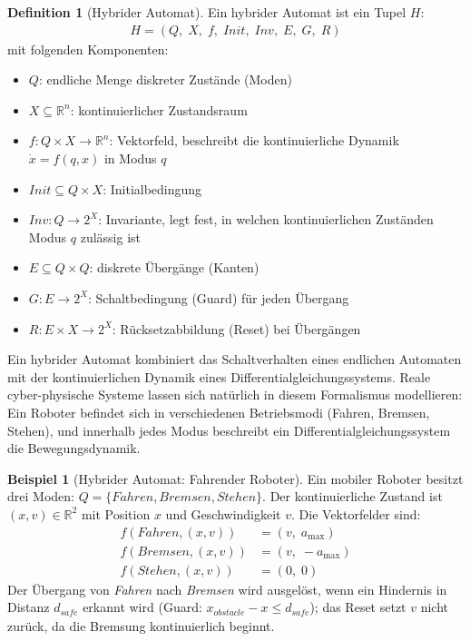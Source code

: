 ﻿\documentclass[a4paper,12pt]{article}
\theoremstyle{definition}
\newtheorem{definition}{Definition}[section]
\newtheorem{beispiel}{Beispiel}[section]
\begin{document}
\begin{definition}[Hybrider Automat]
Ein hybrider Automat ist ein Tupel $H$:
\begin{align*}
  H = (Q,\; X,\; f,\; \mathit{Init},\; \mathit{Inv},\; E,\; G,\; R)
\end{align*}
mit folgenden Komponenten:
\begin{itemize}
  \item[-] $Q$: endliche Menge diskreter Zustände (Moden)
  \item[-] $X \subseteq \mathbb{R}^n$: kontinuierlicher Zustandsraum
  \item[-] $f: Q \times X \to \mathbb{R}^n$: Vektorfeld, beschreibt die kontinuierliche Dynamik $\dot{x} = f(q, x)$ in Modus $q$
  \item[-] $\mathit{Init} \subseteq Q \times X$: Initialbedingung
  \item[-] $\mathit{Inv}: Q \to 2^X$: Invariante, legt fest, in welchen kontinuierlichen Zuständen Modus $q$ zulässig ist
  \item[-] $E \subseteq Q \times Q$: diskrete Übergänge (Kanten)
  \item[-] $G: E \to 2^X$: Schaltbedingung (Guard) für jeden Übergang
  \item[-] $R: E \times X \to 2^X$: Rücksetzabbildung (Reset) bei Übergängen
\end{itemize}
\end{definition}

Ein hybrider Automat kombiniert das Schaltverhalten eines endlichen Automaten mit der kontinuierlichen Dynamik eines Differentialgleichungssystems. Reale cyber-physische Systeme lassen sich natürlich in diesem Formalismus modellieren: Ein Roboter befindet sich in verschiedenen Betriebsmodi (Fahren, Bremsen, Stehen), und innerhalb jedes Modus beschreibt ein Differentialgleichungssystem die Bewegungsdynamik.

\begin{beispiel}[Hybrider Automat: Fahrender Roboter]
Ein mobiler Roboter besitzt drei Moden: $Q = \{\mathit{Fahren}, \mathit{Bremsen}, \mathit{Stehen}\}$. Der kontinuierliche Zustand ist $(x, v) \in \mathbb{R}^2$ mit Position $x$ und Geschwindigkeit $v$. Die Vektorfelder sind:
\begin{align}
  f(\mathit{Fahren}, (x,v))  &= (v,\; a_{\max}) \\
  f(\mathit{Bremsen}, (x,v)) &= (v,\; -a_{\max}) \\
  f(\mathit{Stehen}, (x,v))  &= (0,\; 0)
\end{align}
Der Übergang von \textit{Fahren} nach \textit{Bremsen} wird ausgelöst, wenn ein Hindernis in Distanz $d_{\mathit{safe}}$ erkannt wird (Guard: $x_{\mathit{obstacle}} - x \leq d_{\mathit{safe}}$); das Reset setzt $v$ nicht zurück, da die Bremsung kontinuierlich beginnt.
\end{beispiel}
\end{document}
